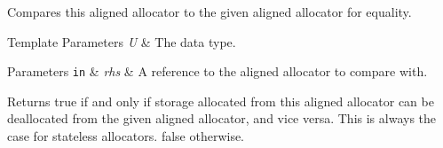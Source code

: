 Compares this aligned allocator to the given aligned allocator for equality.


\begin{DoxyTemplParams}{Template Parameters}
{\em U} & The data type. \\
\hline
\end{DoxyTemplParams}

\begin{DoxyParams}[1]{Parameters}
\mbox{\tt in}  & {\em rhs} & A reference to the aligned allocator to compare with. \\
\hline
\end{DoxyParams}
\begin{DoxyReturn}{Returns}
{\ttfamily true} if and only if storage allocated from this aligned allocator can be deallocated from the given aligned allocator, and vice versa. This is always the case for stateless allocators. {\ttfamily false} otherwise. 
\end{DoxyReturn}
